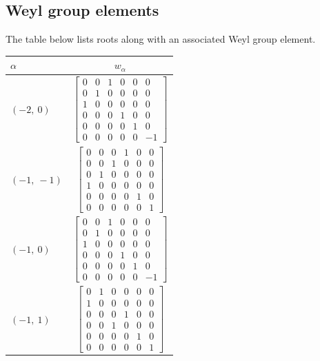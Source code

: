 \documentclass[11pt]{article}
\newcommand{\noi}{\noindent}
\theoremstyle{definition}
\begin{document}
\subsection{Weyl group elements}

\noi The table below lists roots along with an associated Weyl group element.

\bigskip

\noi \noindent \begin{longtable}{|l|c|}
    \hline
    $\alpha$ & $w_\alpha$ \\
    \hline
    \endhead
    $\left( -2, \  0\right)$ & ${\left[\begin{matrix}0 & 0 & 1 & 0 & 0 & 0\\0 & 1 & 0 & 0 & 0 & 0\\1 & 0 & 0 & 0 & 0 & 0\\0 & 0 & 0 & 1 & 0 & 0\\0 & 0 & 0 & 0 & 1 & 0\\0 & 0 & 0 & 0 & 0 & -1\end{matrix}\right]}$ \\
    \hline
    $\left( -1, \  -1\right)$ & ${\left[\begin{matrix}0 & 0 & 0 & 1 & 0 & 0\\0 & 0 & 1 & 0 & 0 & 0\\0 & 1 & 0 & 0 & 0 & 0\\1 & 0 & 0 & 0 & 0 & 0\\0 & 0 & 0 & 0 & 1 & 0\\0 & 0 & 0 & 0 & 0 & 1\end{matrix}\right]}$ \\
    \hline
    $\left( -1, \  0\right)$ & ${\left[\begin{matrix}0 & 0 & 1 & 0 & 0 & 0\\0 & 1 & 0 & 0 & 0 & 0\\1 & 0 & 0 & 0 & 0 & 0\\0 & 0 & 0 & 1 & 0 & 0\\0 & 0 & 0 & 0 & 1 & 0\\0 & 0 & 0 & 0 & 0 & -1\end{matrix}\right]}$ \\
    \hline
    $\left( -1, \  1\right)$ & ${\left[\begin{matrix}0 & 1 & 0 & 0 & 0 & 0\\1 & 0 & 0 & 0 & 0 & 0\\0 & 0 & 0 & 1 & 0 & 0\\0 & 0 & 1 & 0 & 0 & 0\\0 & 0 & 0 & 0 & 1 & 0\\0 & 0 & 0 & 0 & 0 & 1\end{matrix}\right]}$ \\

\end{longtable}
\end{document}
